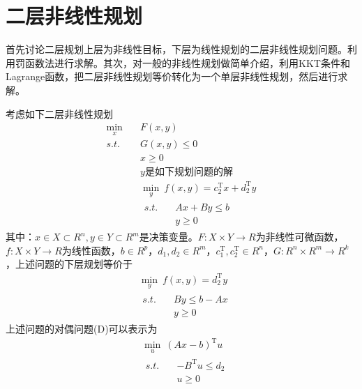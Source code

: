 \section{二层非线性规划}
    \par
    首先讨论二层规划上层为非线性目标，下层为线性规划的二层非线性规划问题。利用罚函数法进行求解。其次，对一般的非线性规划做简单介绍，利用KKT条件和Lagrange函数，把二层非线性规划等价转化为一个单层非线性规划，然后进行求解。
        \par
        考虑如下二层非线性规划
        \begin{align*}
            \mathop{\min}\limits_{x}\quad &F(x,y)\\
            s.t.\quad & G(x,y)\leqslant 0\\
            & x\geqslant 0\\
            &y\text{是如下规划问题的解}\\
           & \mathop{\min}\limits_{y}\  f(x,y)=c_2^\mathrm{T} x+d_2^\mathrm{T} y\\
           &\begin{aligned}
           s.t.\quad & Ax+By\leqslant b\\
           & y \geqslant 0
           \end{aligned}
        \end{align*}
        其中：$x\in X\subset R^n,y\in Y\subset R^m$是决策变量。$F:X\times Y\to R$为非线性可微函数，$f:X\times Y\to R$为线性函数，$b \in R^p$，$d_1,d_2\in R^m$，$c_1^\mathrm{T} ,c_2^\mathrm{T} \in R^n$，$G:R^n \times R^m\to R^k$，上述问题的下层规划等价于
        \begin{align*}
            & \mathop{\min}\limits_{y}\ f(x,y)=d_2^\mathrm{T} y\\
            & \begin{aligned}
            s.t.\quad & By\leqslant b-Ax\\
            & y \geqslant 0
            \end{aligned}
        \end{align*}
        上述问题的对偶问题(D)可以表示为
        \begin{align*}
            & \mathop{\min}\limits_{u}\  (Ax-b)^\mathrm{T} u\\
            & \begin{aligned}
            s.t.\quad & -B^\mathrm{T} u \leqslant d_2\\
            & u \geqslant 0
            \end{aligned}
        \end{align*}
